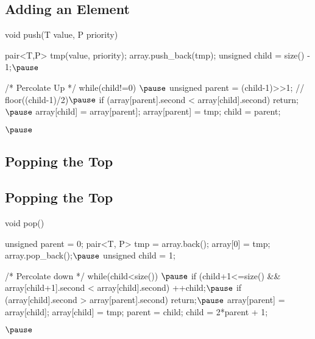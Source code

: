 
\begin{slide}
\section{Adding an Element}

\begin{PauseHighLight}
  \begin{cpp}
  void push(T value, P priority) {
    pair<T,P> tmp(value, priority);
    array.push_back(tmp);
    unsigned child = size() - 1;$\pause$
    
    /* Percolate Up */
    while(child!=0) {$\pause$
      unsigned parent = (child-1)>>1;  // floor((child-1)/2)$\pause$
      if (array[parent].second < array[child].second)
        return;$\pause$
      array[child] = array[parent];
      array[parent] = tmp;
      child = parent;
    }
  }$\pause$
\end{cpp}
\end{PauseHighLight}

\end{slide}


\begin{slide}
\section{Popping the Top}
\pb\pause{}

\begin{center}
  \pause
\end{center}

\end{slide}



\begin{slide}
\section{Popping the Top}

\begin{cpp}
    void pop() {
    unsigned parent = 0;
    pair<T, P> tmp = array.back();
    array[0] = tmp;
    array.pop_back();$\pause$
    unsigned child = 1;

    /* Percolate down */
    while(child<size()) {$\pause$
      if (child+1<=size() && array[child+1].second < array[child].second)
	++child;$\pause$
      if (array[child].second > array[parent].second)
	return;$\pause$
      array[parent] = array[child];
      array[child] = tmp;
      parent = child;
      child = 2*parent + 1;
    }
  }$\pause$
\end{cpp}
\end{slide}

